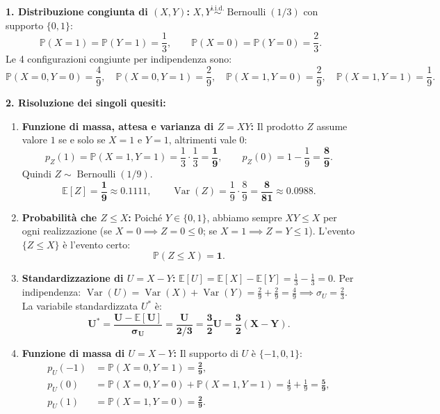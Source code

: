 \documentclass[11pt,a4paper]{article}
\newcommand{\EE}{\mathbb{E}}
\newcommand{\Prob}{\mathbb{P}}
\newcommand{\Var}{\operatorname{Var}}
\begin{document}
\begin{soluzionebox}
\textbf{1. Distribuzione congiunta di $(X,Y)$:}
$X, Y \overset{\text{i.i.d.}}{\sim} \operatorname{Bernoulli}(1/3)$ con supporto $\{0, 1\}$:
\[
\Prob(X=1) = \Prob(Y=1) = \frac{1}{3}, \qquad \Prob(X=0) = \Prob(Y=0) = \frac{2}{3}.
\]
Le 4 configurazioni congiunte per indipendenza sono:
\[
\Prob(X=0, Y=0) = \frac{4}{9}, \quad \Prob(X=0, Y=1) = \frac{2}{9}, \quad \Prob(X=1, Y=0) = \frac{2}{9}, \quad \Prob(X=1, Y=1) = \frac{1}{9}.
\]

\textbf{2. Risoluzione dei singoli quesiti:}
\begin{enumerate}[label=(\roman*)]
    \item \textbf{Funzione di massa, attesa e varianza di $Z = XY$:}
    Il prodotto $Z$ assume valore $1$ se e solo se $X=1$ e $Y=1$, altrimenti vale $0$:
    \[
    p_Z(1) = \Prob(X=1, Y=1) = \frac{1}{3} \cdot \frac{1}{3} = \bm{\frac{1}{9}}, \qquad p_Z(0) = 1 - \frac{1}{9} = \bm{\frac{8}{9}}.
    \]
    Quindi $Z \sim \operatorname{Bernoulli}(1/9)$.
    \[
    \EE[Z] = \bm{\frac{1}{9}} \approx \bm{0.1111}, \qquad \Var(Z) = \frac{1}{9} \cdot \frac{8}{9} = \bm{\frac{8}{81}} \approx \bm{0.0988}.
    \]

    \item \textbf{Probabilità che $Z \le X$:}
    Poiché $Y \in \{0, 1\}$, abbiamo sempre $XY \le X$ per ogni realizzazione (se $X=0 \implies Z=0 \le 0$; se $X=1 \implies Z=Y \le 1$). L'evento $\{Z \le X\}$ è l'evento certo:
    \[
    \Prob(Z \le X) = \bm{1}.
    \]

    \item \textbf{Standardizzazione di $U = X - Y$:}
    $\EE[U] = \EE[X] - \EE[Y] = \frac{1}{3} - \frac{1}{3} = 0$.
    Per indipendenza: $\Var(U) = \Var(X) + \Var(Y) = \frac{2}{9} + \frac{2}{9} = \frac{4}{9} \implies \sigma_U = \frac{2}{3}$.
    La variabile standardizzata $U^*$ è:
    \[
    \bm{U^* = \frac{U - \EE[U]}{\sigma_U} = \frac{U}{2/3} = \frac{3}{2}U = \frac{3}{2}(X - Y)}.
    \]

    \item \textbf{Funzione di massa di $U = X - Y$:}
    Il supporto di $U$ è $\{-1, 0, 1\}$:
    \begin{align*}
    p_U(-1) &= \Prob(X=0, Y=1) = \bm{\frac{2}{9}}, \\
    p_U(0) &= \Prob(X=0, Y=0) + \Prob(X=1, Y=1) = \frac{4}{9} + \frac{1}{9} = \bm{\frac{5}{9}}, \\
    p_U(1) &= \Prob(X=1, Y=0) = \bm{\frac{2}{9}}.
    \end{align*}


\end{enumerate}
\end{soluzionebox}
\end{document}
